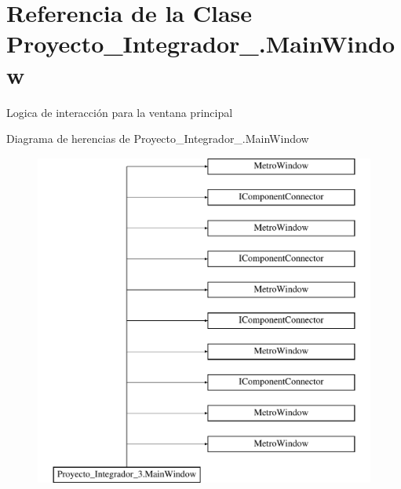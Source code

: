 \hypertarget{class_proyecto___integrador__3_1_1_main_window}{\section{Referencia de la Clase Proyecto\-\_\-\-Integrador\-\_.\-Main\-Window}
\label{class_proyecto___integrador__3_1_1_main_window}
}


Logica de interacción para la ventana principal  


Diagrama de herencias de Proyecto\-\_\-\-Integrador\-\_.\-Main\-Window\begin{figure}[H]
\begin{center}
\leavevmode
\includegraphics[height=11.000000cm]{d3/dfd/class_proyecto___integrador__3_1_1_main_window}
\end{center}
\end{figure}
